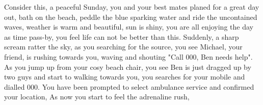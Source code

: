Consider this, a peaceful Sunday, you and your best mates planed for a great day out, bath on the beach, peddle the blue sparking water and ride the uncontained waves, weather is warm and beautiful, sun is shiny, you are all enjoying the day as time pass-by, you feel life can not be better than this. Suddenly, a sharp scream ratter the sky, as you searching for the source, you see Michael, your friend, is rushing towards you, waving and shouting "Call 000, Ben needs help". As you jump up from your cosy beach chair, you see Ben is just dragged up by two guys and start to walking towards you, you searches for your mobile and dialled 000. You have been prompted to select ambulance service and confirmed your location, As now you start to feel the adrenaline rush,  